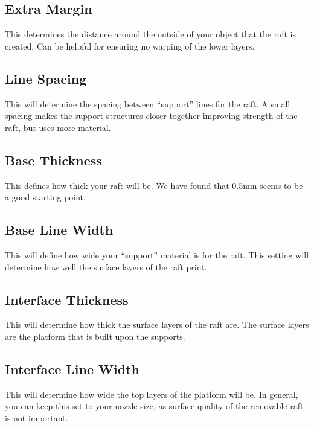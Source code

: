 \subsection{Extra Margin}

This determines the distance around the outside of your object that the raft is created. Can be helpful for ensuring no warping of the lower layers.

\subsection{Line Spacing}

This will determine the spacing between “support” lines for the raft. A small spacing makes the support structures closer together improving strength of the raft, but uses more material.

\subsection{Base Thickness}

This defines how thick your raft will be. We have found that 0.5mm seems to be a good starting point.

\subsection{Base Line Width}

This will define how wide your “support” material is for the raft. This setting will determine how well the surface layers of the raft print.

\subsection{Interface Thickness}

This will determine how thick the surface layers of the raft are. The surface layers are the platform that is built upon the supports.

\subsection{Interface Line Width}

This will determine how wide the top layers of the platform will be. In general, you can keep this set to your nozzle size, as surface quality of the removable raft is not important.

